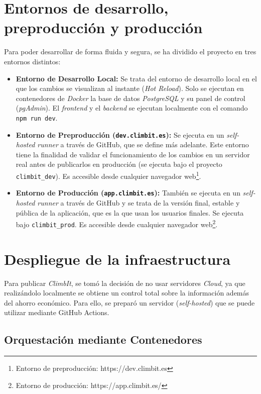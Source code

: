 \section{Entornos de desarrollo, preproducción y producción}

Para poder desarrollar de forma fluida y segura, se ha dividido el proyecto en tres entornos distintos:

\begin{itemize}
    \item \textbf{Entorno de Desarrollo Local:} Se trata del entorno de desarrollo local en el que los cambios se visualizan al instante (\textit{Hot Reload}). Solo se ejecutan en contenedores de \textit{Docker} la base de datos \textit{PostgreSQL} y su panel de control (\textit{pgAdmin}). El \textit{frontend} y el \textit{backend} se ejecutan localmente con el comando \texttt{npm run dev}.
    
    \item \textbf{Entorno de Preproducción (\texttt{dev.climbit.es}):} Se ejecuta en un \textit{self-hosted runner} a través de GitHub, que se define más adelante. Este entorno tiene la finalidad de validar el funcionamiento de los cambios en un servidor real antes de publicarlos en producción (se ejecuta bajo el proyecto \texttt{climbit\_dev}). Es accesible desde cualquier navegador web\footnote{Entorno de preproducción: https://dev.climbit.es}.
    
    \item \textbf{Entorno de Producción (\texttt{app.climbit.es}):} También se ejecuta en un \textit{self-hosted runner} a través de GitHub y se trata de la versión final, estable y pública de la aplicación, que es la que usan los usuarios finales. Se ejecuta bajo \texttt{climbit\_prod}. Es accesible desde cualquier navegador web\footnote{Entorno de producción: https://app.climbit.es/}.
\end{itemize}

\section{Despliegue de la infraestructura}

Para publicar \textit{ClimbIt}, se tomó la decisión de no usar servidores \textit{Cloud}, ya que realizándolo localmente se obtiene un control total sobre la información además del ahorro económico. Para ello, se preparó un servidor (\textit{self-hosted}) que se puede utilizar mediante GitHub Actions.

\subsection{Orquestación mediante Contenedores}

